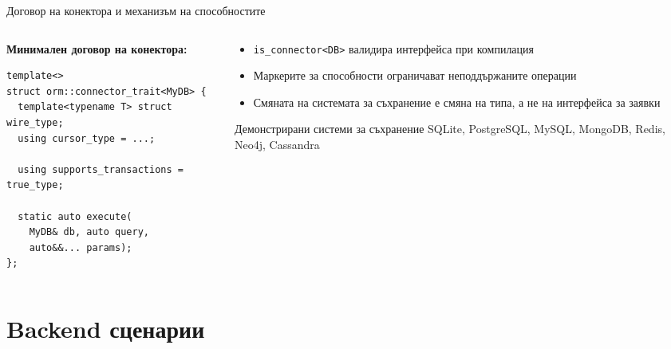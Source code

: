 \documentclass[aspectratio=169,12pt]{beamer}
\begin{document}
\begin{frame}[fragile]{Договор на конектора и механизъм на способностите}
    \begin{columns}[T]
        \begin{column}{0.52\textwidth}
            \textbf{Минимален договор на конектора:}
\begin{lstlisting}
template<>
struct orm::connector_trait<MyDB> {
  template<typename T> struct wire_type;
  using cursor_type = ...;

  using supports_transactions = true_type;

  static auto execute(
    MyDB& db, auto query,
    auto&&... params);
};
\end{lstlisting}
        \end{column}
        \begin{column}{0.45\textwidth}
            \begin{itemize}\small
                \item \texttt{is\_connector<DB>} валидира интерфейса при компилация
                \item Маркерите за способности ограничават неподдържаните операции
                \item Смяната на системата за съхранение е смяна на типа, а не на интерфейса за заявки
            \end{itemize}
            \vspace{0.15em}
            \begin{block}{Демонстрирани системи за съхранение}
                {\small SQLite, PostgreSQL, MySQL, MongoDB, Redis, Neo4j, Cassandra}
            \end{block}
        \end{column}
    \end{columns}
\end{frame}

\section{Backend сценарии}
\end{document}

